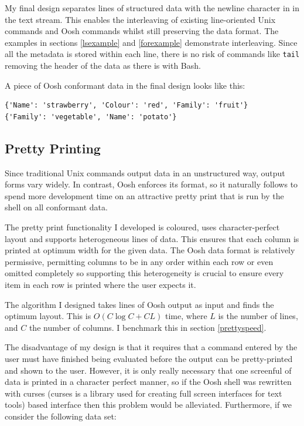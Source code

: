 \documentclass[12pt,twoside,notitlepage]{report}
\begin{document}
My final design separates lines of structured data with the newline
character in in the text stream. This enables the interleaving of
existing line-oriented Unix commands and Oosh commands whilst still
preserving the data format. The examples in sections \ref{lsexample}
and \ref{forexample} demonstrate interleaving. Since all the metadata is
stored within each line, there is no risk of commands like {\tt tail}
removing the header of the data as there is with Bash.

A piece of Oosh conformant data in the final design looks like this:

\begin{verbatim}
{'Name': 'strawberry', 'Colour': 'red', 'Family': 'fruit'}
{'Family': 'vegetable', 'Name': 'potato'}
\end{verbatim}

\subsection{Pretty Printing}
\label{prettyimpl}
Since traditional Unix commands output data in an unstructured way, output forms
vary widely. In contrast, Oosh enforces its format, so it naturally follows to
spend more development time on an attractive pretty print that is run by the
shell on all conformant data.

The pretty print functionality I developed is coloured, uses character-perfect
layout and supports heterogeneous lines of data. This ensures that each column
is printed at optimum width for the given data. The Oosh data format
is relatively permissive, permitting columns to be in any order within
each row or even omitted completely so supporting this heterogeneity
is crucial to ensure every item in each row is printed where the user
expects it.

The algorithm I designed takes lines of Oosh output as input and finds
the optimum layout. This is $O(C \log C + CL)$ time, where $L$ is the
number of lines, and $C$ the number of columns. I benchmark this
in section \ref{prettyspeed}.

The disadvantage of my design is that it requires that a command
entered by the user must have finished being evaluated before the
output can be pretty-printed and shown to the user. However, it is
only really necessary that one screenful of data is printed in a
character perfect manner, so if the Oosh shell was rewritten with
curses (curses is a library used for creating full screen interfaces
for text tools) based interface then this problem would be
alleviated. Furthermore, if we consider the following data set:
\end{document}
